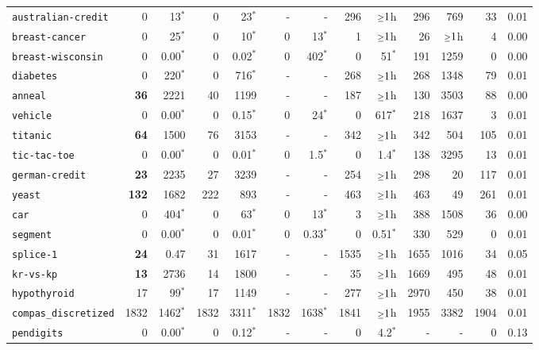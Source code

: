 \begin{tabular}{lrrrrrrrrrrrr}
\texttt{australian-credit} & 0 & 13$^*$ & 0 & 23$^*$ & - & - & 296 & $\mathsmaller{\geq}1$h & 296 & 769 & 33 & 0.01\\
\texttt{breast-cancer} & 0 & 25$^*$ & 0 & 10$^*$ & 0 & 13$^*$ & 1 & $\mathsmaller{\geq}1$h & 26 & $\mathsmaller{\geq}1$h & 4 & 0.00\\
\texttt{breast-wisconsin} & 0 & 0.00$^*$ & 0 & 0.02$^*$ & 0 & 402$^*$ & 0 & 51$^*$ & 191 & 1259 & 0 & 0.00\\
\texttt{diabetes} & 0 & 220$^*$ & 0 & 716$^*$ & - & - & 268 & $\mathsmaller{\geq}1$h & 268 & 1348 & 79 & 0.01\\
\texttt{anneal} & \textbf{36} & 2221 & 40 & 1199 & - & - & 187 & $\mathsmaller{\geq}1$h & 130 & 3503 & 88 & 0.00\\
\texttt{vehicle} & 0 & 0.00$^*$ & 0 & 0.15$^*$ & 0 & 24$^*$ & 0 & 617$^*$ & 218 & 1637 & 3 & 0.01\\
\texttt{titanic} & \textbf{64} & 1500 & 76 & 3153 & - & - & 342 & $\mathsmaller{\geq}1$h & 342 & 504 & 105 & 0.01\\
\texttt{tic-tac-toe} & 0 & 0.00$^*$ & 0 & 0.01$^*$ & 0 & 1.5$^*$ & 0 & 1.4$^*$ & 138 & 3295 & 13 & 0.01\\
\texttt{german-credit} & \textbf{23} & 2235 & 27 & 3239 & - & - & 254 & $\mathsmaller{\geq}1$h & 298 & 20 & 117 & 0.01\\
\texttt{yeast} & \textbf{132} & 1682 & 222 & 893 & - & - & 463 & $\mathsmaller{\geq}1$h & 463 & 49 & 261 & 0.01\\
\texttt{car} & 0 & 404$^*$ & 0 & 63$^*$ & 0 & 13$^*$ & 3 & $\mathsmaller{\geq}1$h & 388 & 1508 & 36 & 0.00\\
\texttt{segment} & 0 & 0.00$^*$ & 0 & 0.01$^*$ & 0 & 0.33$^*$ & 0 & 0.51$^*$ & 330 & 529 & 0 & 0.01\\
\texttt{splice-1} & \textbf{24} & 0.47 & 31 & 1617 & - & - & 1535 & $\mathsmaller{\geq}1$h & 1655 & 1016 & 34 & 0.05\\
\texttt{kr-vs-kp} & \textbf{13} & 2736 & 14 & 1800 & - & - & 35 & $\mathsmaller{\geq}1$h & 1669 & 495 & 48 & 0.01\\
\texttt{hypothyroid} & 17 & 99$^*$ & 17 & 1149 & - & - & 277 & $\mathsmaller{\geq}1$h & 2970 & 450 & 38 & 0.01\\
\texttt{compas\_discretized} & 1832 & 1462$^*$ & 1832 & 3311$^*$ & 1832 & 1638$^*$ & 1841 & $\mathsmaller{\geq}1$h & 1955 & 3382 & 1904 & 0.01\\
\texttt{pendigits} & 0 & 0.00$^*$ & 0 & 0.12$^*$ & - & - & 0 & 4.2$^*$ & - & - & 0 & 0.13\\

\end{tabular}
